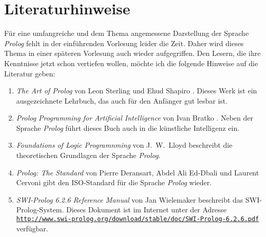 \section{Literaturhinweise}
F\"{u}r eine umfangreiche und dem Thema angemessene Darstellung der Sprache \textsl{Prolog} 
fehlt in der einf\"{u}hrenden Vorlesung leider die Zeit.  Daher wird dieses Thema in einer
sp\"{a}teren Vorlesung auch wieder aufgegriffen.  Den Lesern, die ihre Kenntnisse jetzt schon
vertiefen wollen, m\"{o}chte ich die folgende Hinweise auf die Literatur geben:
\begin{enumerate}
\item \emph{The Art of Prolog} von Leon Sterling und Ehud Shapiro \cite{sterling:94}.
      Dieses Werk ist ein ausgezeichnete Lehrbuch, das auch f\"{u}r den Anf\"{a}nger gut lesbar ist.
\item \emph{Prolog Programming for Artificial Intelligence} von Ivan Bratko
      \cite{bratko:90}.  Neben der Sprache \textsl{Prolog} f\"{u}hrt dieses Buch auch in die
      k\"{u}nstliche Intelligenz ein.
\item \emph{Foundations of Logic Programnming}   von J.~W.~Lloyd \cite{lloyd:87}
      beschreibt die theoretischen Grundlagen der Sprache \textsl{Prolog}.
\item \emph{Prolog: The Standard} von Pierre Deransart, Abdel Ali Ed-Dbali und Laurent
      Cervoni \cite{deransart:96} gibt den ISO-Standard f\"{u}r die Sprache
      \textsl{Prolog} wieder.
\item \emph{SWI-Prolog 6.2.6 Reference Manual} von Jan Wielemaker \cite{wielemaker:2013}
      beschreibt das SWI-Prolog-System.  Dieses Dokument ist im Internet unter der Adresse 
      \\[0.1cm]
      \hspace*{1.3cm}      
      \href{http://www.swi-prolog.org/download/stable/doc/SWI-Prolog-6.2.6.pdf}{\texttt{http://www.swi-prolog.org/download/stable/doc/SWI-Prolog-6.2.6.pdf}}
      \\[0.1cm]
      verf\"{u}gbar.
\end{enumerate}

